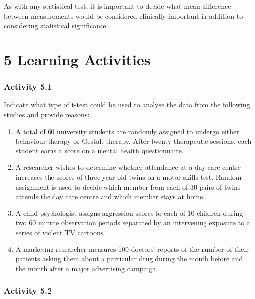 \documentclass[
]{memoir}
\providecommand{\tightlist}{%
  \setlength{\itemsep}{0pt}\setlength{\parskip}{0pt}}
\begin{document}
As with any statistical test, it is important to decide what mean difference between measurements would be considered clinically important in addition to considering statistical significance.

\hypertarget{learning-activities-4}{%
\chapter*{\texorpdfstring{\textbf{5} Learning Activities}{5 Learning Activities}}\label{learning-activities-4}}

\hypertarget{activity-5.1}{%
\subsection*{Activity 5.1}\label{activity-5.1}}

Indicate what type of t-test could be used to analyse the data from the following studies and provide reasons:

\begin{enumerate}
\def\labelenumi{\alph{enumi})}
\tightlist
\item
  A total of 60 university students are randomly assigned to undergo either behaviour therapy or Gestalt therapy. After twenty therapeutic sessions, each student earns a score on a mental health questionnaire.
\item
  A researcher wishes to determine whether attendance at a day care centre increases the scores of three year old twins on a motor skills test. Random assignment is used to decide which member from each of 30 pairs of twins attends the day care centre and which member stays at home.
\item
  A child psychologist assigns aggression scores to each of 10 children during two 60 minute observation periods separated by an intervening exposure to a series of violent TV cartoons.
\item
  A marketing researcher measures 100 doctors' reports of the number of their patients asking them about a particular drug during the month before and the month after a major advertising campaign.
\end{enumerate}

\hypertarget{activity-5.2}{%
\subsection*{Activity 5.2}\label{activity-5.2}}
\end{document}

